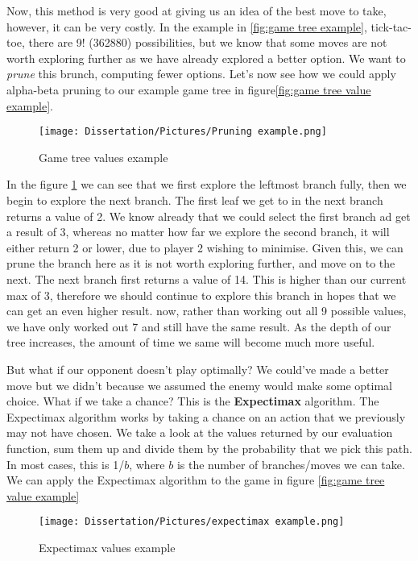 \documentclass[]{final_report}
\begin{document}
Now, this method is very good at giving us an idea of the best move to take, however, it can be very costly. In the example in \ref{fig:game tree example}, tick-tac-toe, there are 9! (362880) possibilities, but we know that some moves are not worth exploring further as we have already explored a better option. We want to \textit{prune} this brunch, computing fewer options. Let's now see how we could apply alpha-beta pruning to our example game tree in figure\ref{fig:game tree value example}.

\begin{figure}[!htp]
    \centering
    \texttt{[image: Dissertation/Pictures/Pruning example.png]}
    \caption{Game tree values example \cite{russell2016artificial}}
    \label{fig: pruninmg example}
\end{figure}
\newpage
In the figure \ref{fig: pruninmg example} we can see that we first explore the leftmost branch fully, then we begin to explore the next branch. The first leaf we get to in the next branch returns a value of 2. We know already that we could select the first branch ad get a result of 3, whereas no matter how far we explore the second branch, it will either return 2 or lower, due to player 2 wishing to minimise. Given this, we can prune the branch here as it is not worth exploring further, and move on to the next. The next branch first returns a value of 14. This is higher than our current max of 3, therefore we should continue to explore this branch in hopes that we can get an even higher result. now, rather than working out all 9 possible values, we have only worked out 7 and still have the same result. As the depth of our tree increases, the amount of time we same will become much more useful. 

But what if our opponent doesn't play optimally? We could've made a better move but we didn't because we assumed the enemy would make some optimal choice. What if we take a chance? This is the \textbf{Expectimax} algorithm. The Expectimax algorithm works by taking a chance on an action that we previously may not have chosen. We take a look at the values returned by our evaluation function, sum them up and divide them by the probability that we pick this path. In most cases, this is 1/$b$, where $b$ is the number of branches/moves we can take. We can apply the Expectimax algorithm to the game in figure \ref{fig:game tree value example}
\newpage
\begin{figure}[!htp]
    \centering
    \texttt{[image: Dissertation/Pictures/expectimax example.png]}
    \caption{Expectimax values example}
    \label{fig: expectimax example}
\end{figure}
\end{document}
